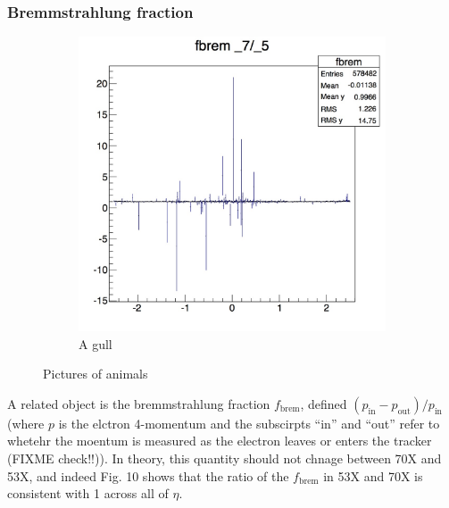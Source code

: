 \documentclass[10pt]{article}
\begin{document}
\subsubsection{Bremmstrahlung fraction}
\begin{figure}[h!]
        \centering
        \begin{subfigure}[b]{0.4\textwidth}
                \includegraphics[width=\textwidth]{Plots/fbrem}
                \caption{A gull}
                \label{fig:gull}
        \end{subfigure}%

        \caption{Pictures of animals}\label{fig:animals}
\end{figure}
A related object is the bremmstrahlung fraction $f_{\text{brem}}$, defined $(p_{\text{in}} -p_{\text{out}})/p_{\text{in}}$ (where $p$ is the elctron 4-momentum and the subscirpts ``in'' and ``out'' refer to whetehr the moentum is measured as the electron leaves or enters the tracker (FIXME check!!)). In theory, this quantity should not chnage between 70X and 53X, and indeed Fig. 10 shows that the ratio of the $f_{\text{brem}}$ in 53X and 70X is consistent with 1 across all of $\eta$.
\end{document}
